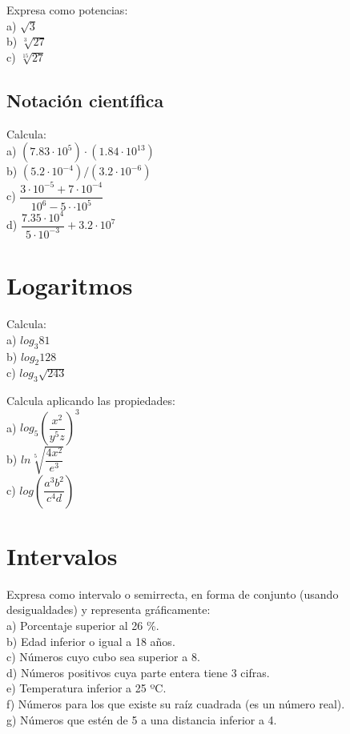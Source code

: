 \begin{ejer}
Expresa como potencias: \\
a) $\sqrt{3}$ \\
b) $\sqrt[3]{27}$ \\
c) $\sqrt[15]{27}$
\end{ejer}

\subsection{Notación científica}

\begin{ejer}
Calcula: \\
a) $(7.83\cdot 10^{5})\cdot (1.84 \cdot 10^{13})$ \\
b) $(5.2 \cdot 10^{-4}) / (3.2 \cdot 10^{-6})$ \\
c) $\dfrac{3 \cdot 10^{-5} +7 \cdot 10^{-4}}{10^{6}-5\cdot \cdot 10^{5}}$ \\
d) $\dfrac{7.35\cdot 10^{4}}{5 \cdot 10^{-3}} + 3.2 \cdot 10^{7}$
\end{ejer}

\section{Logaritmos}

\begin{ejer}
Calcula: \\
a) $log_3 81$ \\
b) $log_2 128$ \\
c) $log_3 \sqrt{243}$ \\
\end{ejer}

\begin{ejer}
Calcula aplicando las propiedades: \\
a) $log_5 \left( \dfrac{x^2}{y^5z} \right)^3$ \\
b) $ln \sqrt[5]{\dfrac{4x^2}{e^3}}$ \\
c) $log \left( \dfrac{a^3 b^2}{c^4 d} \right) $
\end{ejer}

\section{Intervalos}

\begin{ejer}
Expresa como intervalo o semirrecta, en forma de conjunto (usando desigualdades) y representa gráficamente: \\
a) Porcentaje superior al 26 \%. \\
b) Edad inferior o igual a 18 años. \\
c) Números cuyo cubo sea superior a 8. \\
d) Números positivos cuya parte entera tiene 3 cifras. \\
e) Temperatura inferior a 25 ºC. \\
f) Números para los que existe su raíz cuadrada (es un número real). \\
g) Números que estén de 5 a una distancia inferior a 4.
\end{ejer}

